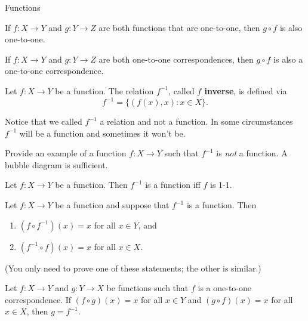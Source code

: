 \begin{section}{Functions}
\begin{theorem}
If \(f:X\to Y\) and \(g:Y\to Z\) are both functions that are one-to-one, then \(g\circ f\) is also one-to-one.
\end{theorem}

\begin{corollary}
If \(f:X\to Y\) and \(g:Y\to Z\) are both one-to-one correspondences, then \(g\circ f\) is also a one-to-one correspondence.
\end{corollary}

\begin{definition}
Let \(f:X\to Y\) be a function.  The relation \(f^{-1}\), called \textbf{\(f\) inverse}, is defined via
\[
f^{-1}=\{(f(x),x):x\in X\}.
\]
\end{definition}

\begin{remark}
Notice that we called \(f^{-1}\) a relation and not a function.  In some circumstances \(f^{-1}\) will be a function and sometimes it won't be.
\end{remark}

\begin{exercise}
Provide an example of a function \(f:X\to Y\) such that \(f^{-1}\) is \emph{not} a function.  A bubble diagram is sufficient.
\end{exercise}

\begin{theorem}
Let \(f:X\to Y\) be a function.  Then \(f^{-1}\) is a function iff \(f\) is 1-1.
\end{theorem}

\begin{theorem}\label{thm:comp of inverses}
Let \(f:X\to Y\) be a function and suppose that \(f^{-1}\) is a function.  Then
\begin{enumerate}
\item \((f\circ f^{-1})(x)=x\) for all \(x\in Y\), and
\item \((f^{-1}\circ f)(x)=x\) for all \(x\in X\).
\end{enumerate}
(You only need to prove one of these statements; the other is similar.)
\end{theorem}

\begin{theorem}\label{thm:unique inverse}
Let \(f:X\to Y\) and \(g:Y\to X\) be functions such that \(f\) is a one-to-one correspondence.  If \((f\circ g)(x)=x\) for all \(x\in Y\) and \((g\circ f)(x)=x\) for all \(x\in X\), then \(g=f^{-1}\).
\end{theorem}


\end{section}
